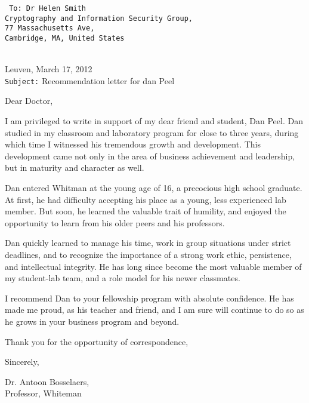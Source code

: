 \documentclass[a4paper,11pt]{article}
\newcommand{\signature}[1] {
    \hspace{92,652 mm}\parbox{87,713mm}{#1}
}
\newcommand{\datesubject}[2] {
    #1\\
    {\tt Subject:} #2
}
\newcommand{\recipient}[1] {
    \begin{multicols}{2}
    \hfill\vfill
    \columnbreak
    {
    \tt \fontsize{10.5}{14}
    To: #1 \\\\
    }
    \end{multicols}
}
\begin{document}
\recipient{
Dr Helen Smith\\
Cryptography and Information Security Group,\\
77 Massachusetts Ave,\\
Cambridge, MA, United States
}

\datesubject
{Leuven, March 17, 2012}
{Recommendation letter for dan Peel}

Dear Doctor, 

I am privileged to write in support of my dear friend and student, Dan Peel. Dan studied in my classroom and
laboratory program for close to three years, during which time I witnessed his tremendous growth and development. This
development came not only in the area of business achievement and leadership, but in maturity and character as well.

Dan entered Whitman at the young age of 16, a precocious high school graduate. At first, he had difficulty accepting his
place as a young, less experienced lab member. But soon, he learned the valuable trait of humility, and enjoyed the
opportunity to learn from his older peers and his professors.

Dan quickly learned to manage his time, work in group situations under strict deadlines, and to recognize the importance
of a strong work ethic, persistence, and intellectual integrity. He has long since become the most valuable member of
my student-lab team, and a role model for his newer classmates.

I recommend Dan to your fellowship program with absolute confidence. He has made me proud, as his teacher and friend,
and I am sure will continue to do so as he grows in your business program and beyond.

Thank you for the opportunity of correspondence,

Sincerely,

\signature{Dr. Antoon Bosselaers,\\Professor, Whiteman}
\end{document}
